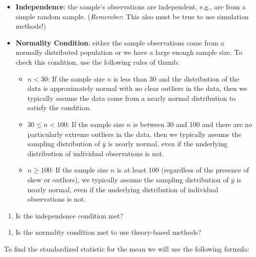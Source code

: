 \documentclass[
]{report}
\providecommand{\tightlist}{%
  \setlength{\itemsep}{0pt}\setlength{\parskip}{0pt}}
\begin{document}
\begin{itemize}
\item
  \textbf{Independence}: the sample's observations are independent, e.g., are from a simple random sample. (\emph{Remember}: This also must be true to use simulation methods!)
\item
  \textbf{Normality Condition}: either the sample observations come from a normally distributed population or we have a large enough sample size. To check this condition, use the following rules of thumb:

  \begin{itemize}
  \item
    \(n < 30\): If the sample size \(n\) is less than 30 and the distribution of the data is approximately normal with no clear outliers in the data, then we typically assume the data come from a nearly normal distribution to satisfy the condition.
  \item
    \(30 \leq n < 100\): If the sample size \(n\) is between 30 and 100 and there are no particularly extreme outliers in the data, then we typically assume the sampling distribution of \(\bar{y}\) is nearly normal, even if the underlying distribution of individual observations is not.
  \item
    \(n \geq 100\): If the sample size \(n\) is at least 100 (regardless of the presence of skew or outliers), we typically assume the sampling distribution of \(\bar{y}\) is nearly normal, even if the underlying distribution of individual observations is not.
  \end{itemize}
\end{itemize}

\begin{enumerate}
\def\labelenumi{\arabic{enumi}.}
\tightlist
\item
  Is the independence condition met?
\end{enumerate}

\vspace{0.5in}

\begin{enumerate}
\def\labelenumi{\arabic{enumi}.}
\setcounter{enumi}{1}
\tightlist
\item
  Is the normality condition met to use theory-based methods?
\end{enumerate}

\vspace{1in}

To find the standardized statistic for the mean we will use the following formula:
\end{document}
